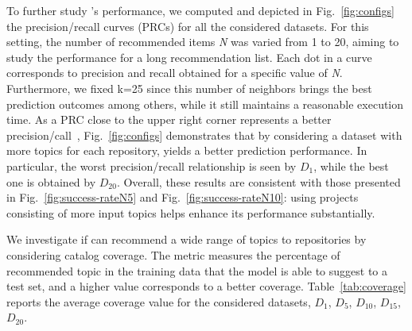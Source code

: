 To further study \TF's performance, we computed and depicted in Fig.~\ref{fig:configs} the precision/recall curves (PRCs) for all the considered datasets. 
For this setting, the number of recommended items \emph{N} was varied from 1 to 20, aiming to study the performance for a long recommendation list. Each dot in a curve corresponds to precision and recall obtained for a specific value of \emph{N}. Furthermore, we fixed k=25 since this number of neighbors brings the best prediction outcomes among others, while it still maintains a reasonable execution time. As a PRC close to the upper right corner represents a better precision/call~\cite{NGUYEN2020110460}, Fig.~\ref{fig:configs} demonstrates that by considering a dataset with more topics for each repository, \TFa yields a better prediction performance. In particular, the worst precision/recall relationship is seen by $D_{1}$, while the best one is obtained by $D_{20}$. Overall, these results are consistent with those presented in Fig.~\ref{fig:success-rateN5} and Fig.~\ref{fig:success-rateN10}: using projects consisting of more input topics helps \TFa enhance its performance substantially.




We investigate if \TFa can recommend a wide range of topics to repositories by considering catalog coverage. The metric measures the percentage of recommended topic in the training data that the model is able to suggest to a test set, and a higher value corresponds to a better coverage. 
Table~\ref{tab:coverage} reports the average coverage value for the considered datasets, \ie $D_{1}$, $D_{5}$, $D_{10}$, $D_{15}$, $D_{20}$. %

